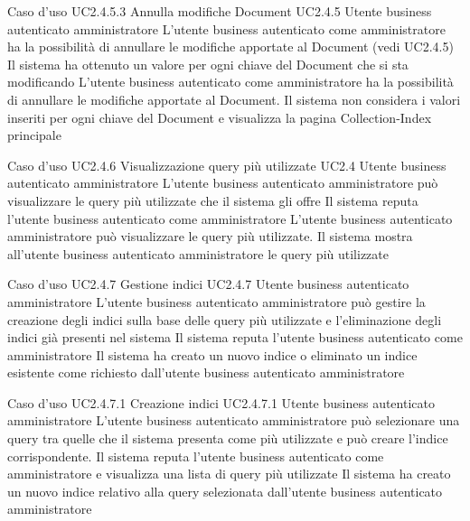 \UCtitle
{Caso d'uso UC2.4.5.3}
{Annulla modifiche Document}
\UC
{UC2.4.5}
{Utente business autenticato amministratore}
{L'utente business autenticato come amministratore ha la possibilità di annullare le modifiche apportate al Document (vedi UC2.4.5)}
{Il sistema ha ottenuto un valore per ogni chiave del Document che si sta modificando}
\scenario
{L'utente business autenticato come amministratore ha la possibilità di annullare le modifiche apportate al Document.}
\post
{Il sistema non considera i valori inseriti per ogni chiave del Document e visualizza la pagina Collection-Index principale}

\UCtitle
{Caso d'uso UC2.4.6}
{Visualizzazione query più utilizzate}
\UC
{UC2.4}
{Utente business autenticato amministratore}
{L'utente business autenticato amministratore può visualizzare le query più utilizzate che il sistema gli offre}
{Il sistema reputa l'utente business autenticato come amministratore}
\scenario
{L'utente business autenticato amministratore può visualizzare le query più utilizzate.}
\post
{Il sistema mostra all'utente business autenticato amministratore le query più utilizzate}

\UCtitle
{Caso d'uso UC2.4.7}
{Gestione indici}
\UC
{UC2.4.7}
{Utente business autenticato amministratore}
{L'utente business autenticato amministratore può gestire la creazione degli indici sulla base delle query più utilizzate e l'eliminazione degli indici già presenti nel sistema}
{Il sistema reputa l'utente business autenticato come amministratore}
\post
{Il sistema ha creato un nuovo indice o eliminato un indice esistente come richiesto dall'utente business autenticato amministratore}

\UCtitle
{Caso d'uso UC2.4.7.1}
{Creazione indici}
\UC
{UC2.4.7.1}
{Utente business autenticato amministratore}
{L'utente business autenticato amministratore può selezionare una query tra quelle che il sistema presenta come più utilizzate e può creare l'indice corrispondente.}
{Il sistema reputa l'utente business autenticato come amministratore e visualizza una lista di query più utilizzate}
\post
{Il sistema ha creato un nuovo indice relativo alla query selezionata dall'utente business autenticato amministratore}


